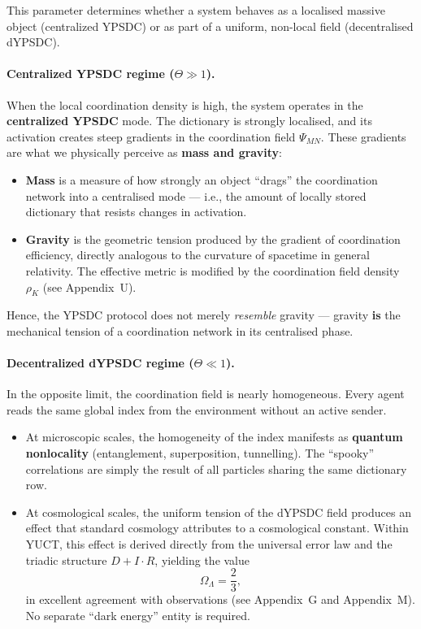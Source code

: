 \documentclass[12pt,a4paper]{article}
\theoremstyle{remark}
\begin{document}
	This parameter determines whether a system behaves as a localised massive object (centralized YPSDC) or as part of a uniform, non-local field (decentralised dYPSDC).
	
	\paragraph{Centralized YPSDC regime (\(\Theta \gg 1\)).}
	When the local coordination density is high, the system operates in the \textbf{centralized YPSDC} mode. The dictionary is strongly localised, and its activation creates steep gradients in the coordination field \(\Psi_{MN}\). These gradients are what we physically perceive as \textbf{mass and gravity}:
	
	\begin{itemize}
		\item \textbf{Mass} is a measure of how strongly an object ``drags'' the coordination network into a centralised mode --- i.e., the amount of locally stored dictionary that resists changes in activation.
		\item \textbf{Gravity} is the geometric tension produced by the gradient of coordination efficiency, directly analogous to the curvature of spacetime in general relativity. The effective metric is modified by the coordination field density \(\rho_K\) (see Appendix~U).
	\end{itemize}
	
	Hence, the YPSDC protocol does not merely \emph{resemble} gravity --- gravity \textbf{is} the mechanical tension of a coordination network in its centralised phase.
	
	\paragraph{Decentralized dYPSDC regime (\(\Theta \ll 1\)).}
	In the opposite limit, the coordination field is nearly homogeneous. Every agent reads the same global index from the environment without an active sender. 
	\begin{itemize}
		\item At microscopic scales, the homogeneity of the index manifests as \textbf{quantum nonlocality} (entanglement, superposition, tunnelling). The ``spooky'' correlations are simply the result of all particles sharing the same dictionary row.
		\item At cosmological scales, the uniform tension of the dYPSDC field produces an effect that standard cosmology attributes to a cosmological constant. Within YUCT, this effect is derived directly from the universal error law and the triadic structure \(D+I\!\cdot\!R\), yielding the value 
		\[
		\Omega_{\Lambda} = \frac{2}{3},
		\]
		in excellent agreement with observations (see Appendix~G and Appendix~M). No separate ``dark energy'' entity is required.
	\end{itemize}
	
\end{document}
